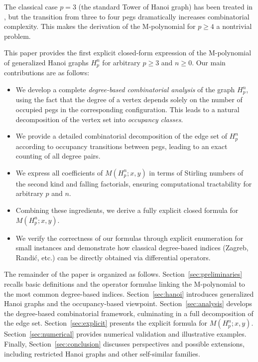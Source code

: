 \documentclass[letterpaper,12pt]{article}
\begin{document}
 
The classical case $p=3$ (the standard Tower of Hanoi graph) has been treated in
\cite{gaur2020m,Asmat}, but the transition from three to four
pegs dramatically increases combinatorial complexity.  This makes the derivation of the M-polynomial for $p\ge 4$ a nontrivial problem.



This paper provides the first explicit closed-form expression of the 
M-polynomial of generalized Hanoi graphs $H_p^n$ for arbitrary 
$p\ge 3$ and $n\ge 0$.
Our main contributions are as follows:
\begin{itemize}
    \item We develop a complete \emph{degree-based combinatorial analysis} of
          the graph $H_p^n$, using the fact that the degree of a vertex depends solely
          on the number of occupied pegs in the corresponding configuration.
          This leads to a natural decomposition of the vertex set into
          \textit{occupancy classes}.
        \item We provide a detailed combinatorial decomposition of the edge set of \(H_p^n\) according to occupancy transitions between pegs, leading to an exact counting of all degree pairs.
    \item We express all coefficients of \(M(H_p^n; x, y)\) in terms of Stirling numbers of the second kind and falling factorials, ensuring computational tractability for arbitrary \(p\) and \(n\).

    \item Combining these ingredients, we  derive a
          fully explicit closed formula for $M(H_p^n;x,y)$.
    \item We verify the correctness of our formulas through explicit enumeration for small instances and demonstrate how classical degree-based indices (Zagreb, Randić, etc.) can be directly obtained via differential operators.
\end{itemize}


The remainder of the paper is organized as follows. 
Section~\ref{sec:preliminaries} recalls basic definitions and the operator 
formulae linking the M-polynomial to the most common degree-based indices.
Section~\ref{sec:hanoi} introduces generalized Hanoi graphs and the 
occupancy-based viewpoint.
Section~\ref{sec:analysis} develops the degree-based combinatorial
framework, culminating in a full decomposition of the edge set.
Section~\ref{sec:explicit} presents the explicit formula for 
$M(H_p^n;x,y)$.
Section~\ref{sec:numerical} provides numerical validation and illustrative 
examples.  
Finally, Section~\ref{sec:conclusion} discusses perspectives and possible 
extensions, including restricted Hanoi graphs and other self-similar families.
\end{document}
